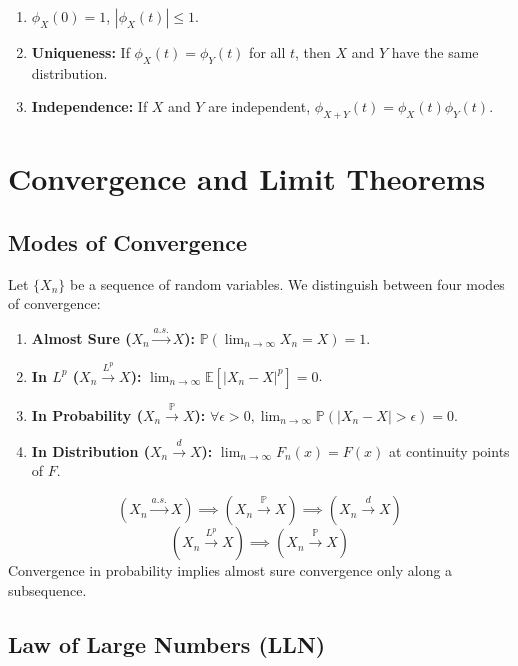\begin{theorem}[Properties]
\begin{enumerate}
    \item $\phi_X(0) = 1$, $|\phi_X(t)| \le 1$.
    \item \textbf{Uniqueness:} If $\phi_X(t) = \phi_Y(t)$ for all $t$, then $X$ and $Y$ have the same distribution.
    \item \textbf{Independence:} If $X$ and $Y$ are independent, $\phi_{X+Y}(t) = \phi_X(t)\phi_Y(t)$.
\end{enumerate}
\end{theorem}

\section{Convergence and Limit Theorems}

\subsection{Modes of Convergence}

Let $\{X_n\}$ be a sequence of random variables. We distinguish between four modes of convergence:

\begin{enumerate}
    \item \textbf{Almost Sure ($X_n \xrightarrow{a.s.} X$):} $\mathbb{P}(\lim_{n \to \infty} X_n = X) = 1$.
    \item \textbf{In $L^p$ ($X_n \xrightarrow{L^p} X$):} $\lim_{n \to \infty} \mathbb{E}[|X_n - X|^p] = 0$.
    \item \textbf{In Probability ($X_n \xrightarrow{\mathbb{P}} X$):} $\forall \epsilon > 0, \lim_{n \to \infty} \mathbb{P}(|X_n - X| > \epsilon) = 0$.
    \item \textbf{In Distribution ($X_n \xrightarrow{d} X$):} $\lim_{n \to \infty} F_n(x) = F(x)$ at continuity points of $F$.
\end{enumerate}

\begin{remark}[Relationships]
\[ (X_n \xrightarrow{a.s.} X) \implies (X_n \xrightarrow{\mathbb{P}} X) \implies (X_n \xrightarrow{d} X) \]
\[ (X_n \xrightarrow{L^p} X) \implies (X_n \xrightarrow{\mathbb{P}} X) \]
Convergence in probability implies almost sure convergence only along a subsequence.
\end{remark}

\subsection{Law of Large Numbers (LLN)}

